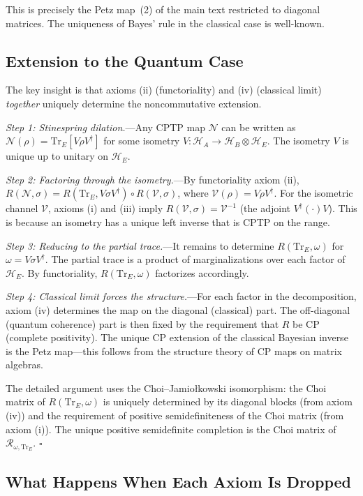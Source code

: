 \documentclass[prl,twocolumn,superscriptaddress,longbibliography]{revtex4-2}
\newcommand{\Tr}{\mathrm{Tr}}
\newcommand{\Petz}{\mathcal{R}}
\newcommand{\chan}{\mathcal{N}}
\newcommand{\hilb}{\mathcal{H}}
\begin{document}
This is precisely the Petz map~(2) of the main text restricted to
diagonal matrices. The uniqueness of Bayes' rule in the classical
case is well-known.

\subsection{Extension to the Quantum Case}

The key insight is that axioms (ii) (functoriality) and (iv) (classical
limit) \emph{together} uniquely determine the noncommutative extension.

\emph{Step 1: Stinespring dilation.}---Any CPTP map $\chan$ can be
written as $\chan(\rho) = \Tr_E[V \rho V^\dagger]$ for some isometry
$V: \hilb_A \to \hilb_B \otimes \hilb_E$. The isometry $V$ is unique up
to unitary on $\hilb_E$.

\emph{Step 2: Factoring through the isometry.}---By functoriality
axiom (ii), $R(\chan, \sigma) = R(\Tr_E, V\sigma V^\dagger) \circ
R(\mathcal{V}, \sigma)$, where $\mathcal{V}(\rho) = V\rho V^\dagger$.
For the isometric channel $\mathcal{V}$, axioms (i) and (iii) imply
$R(\mathcal{V}, \sigma) = \mathcal{V}^{-1}$ (the adjoint
$V^\dagger(\cdot)V$). This is because an isometry has a unique left
inverse that is CPTP on the range.

\emph{Step 3: Reducing to the partial trace.}---It remains to determine
$R(\Tr_E, \omega)$ for $\omega = V\sigma V^\dagger$. The partial trace
is a product of marginalizations over each factor of $\hilb_E$. By
functoriality, $R(\Tr_E, \omega)$ factorizes accordingly.

\emph{Step 4: Classical limit forces the structure.}---For each factor
in the decomposition, axiom (iv) determines the map on the diagonal
(classical) part. The off-diagonal (quantum coherence) part is then
fixed by the requirement that $R$ be CP (complete positivity). The
unique CP extension of the classical Bayesian inverse is the Petz
map---this follows from the structure theory of CP maps on matrix
algebras.

The detailed argument uses the Choi--Jamio\l{}kowski isomorphism:
the Choi matrix of $R(\Tr_E, \omega)$ is uniquely determined by
its diagonal blocks (from axiom (iv)) and the requirement of positive
semidefiniteness of the Choi matrix (from axiom (i)). The unique
positive semidefinite completion is the Choi matrix of
$\Petz_{\omega, \Tr_E}$. \hfill$\square$

\subsection{What Happens When Each Axiom Is Dropped}
\end{document}
